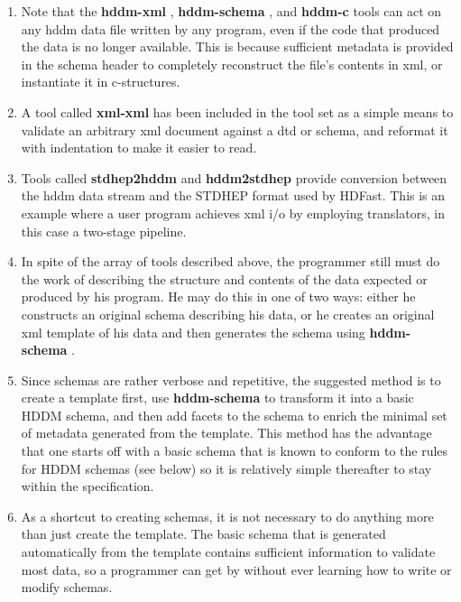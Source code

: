 \documentclass[10pt]{article}
\begin{document}
\begin{enumerate}
\item  Note that the \textbf{hddm-xml}
, \textbf{hddm-schema}
, and \textbf{hddm-c}
 tools can act on any hddm data file written by any program, even if the code that produced the data is no longer available. This is because sufficient metadata is provided in the schema header to completely reconstruct the file's contents in xml, or instantiate it in c-structures. 
\item  A tool called \textbf{xml-xml}
 has been included in the tool set as a simple means to validate an arbitrary xml document against a dtd or schema, and reformat it with indentation to make it easier to read. 
\item  Tools called \textbf{stdhep2hddm}
 and \textbf{hddm2stdhep}
 provide conversion between the hddm data stream and the STDHEP format used by HDFast. This is an example where a user program achieves xml i/o by employing translators, in this case a two-stage pipeline. 
\item  In spite of the array of tools described above, the programmer still must do the work of describing the structure and contents of the data expected or produced by his program. He may do this in one of two ways: either he constructs an original schema describing his data, or he creates an original xml template of his data and then generates the schema using \textbf{hddm-schema}
. 
\item  Since schemas are rather verbose and repetitive, the suggested method is to create a template first, use \textbf{hddm-schema}
 to transform it into a basic HDDM schema, and then add facets to the schema to enrich the minimal set of metadata generated from the template. This method has the advantage that one starts off with a basic schema that is known to conform to the rules for HDDM schemas (see below) so it is relatively simple thereafter to stay within the specification. 
\item  As a shortcut to creating schemas, it is not necessary to do anything more than just create the template. The basic schema that is generated automatically from the template contains sufficient information to validate most data, so a programmer can get by without ever learning how to write or modify schemas. 

\end{enumerate}
\end{document}
